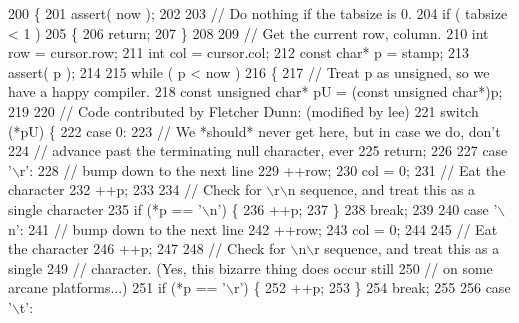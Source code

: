 \begin{DoxyCode}
200 \{
201   assert( now );
202 
203   \textcolor{comment}{// Do nothing if the tabsize is 0.}
204   \textcolor{keywordflow}{if} ( tabsize < 1 )
205   \{
206     \textcolor{keywordflow}{return};
207   \}
208 
209   \textcolor{comment}{// Get the current row, column.}
210   \textcolor{keywordtype}{int} row = cursor.row;
211   \textcolor{keywordtype}{int} col = cursor.col;
212   \textcolor{keyword}{const} \textcolor{keywordtype}{char}* p = stamp;
213   assert( p );
214 
215   \textcolor{keywordflow}{while} ( p < now )
216   \{
217     \textcolor{comment}{// Treat p as unsigned, so we have a happy compiler.}
218     \textcolor{keyword}{const} \textcolor{keywordtype}{unsigned} \textcolor{keywordtype}{char}* pU = (\textcolor{keyword}{const} \textcolor{keywordtype}{unsigned} \textcolor{keywordtype}{char}*)p;
219 
220     \textcolor{comment}{// Code contributed by Fletcher Dunn: (modified by lee)}
221     \textcolor{keywordflow}{switch} (*pU) \{
222       \textcolor{keywordflow}{case} 0:
223         \textcolor{comment}{// We *should* never get here, but in case we do, don't}
224         \textcolor{comment}{// advance past the terminating null character, ever}
225         \textcolor{keywordflow}{return};
226 
227       \textcolor{keywordflow}{case} \textcolor{charliteral}{'\(\backslash\)r'}:
228         \textcolor{comment}{// bump down to the next line}
229         ++row;
230         col = 0;        
231         \textcolor{comment}{// Eat the character}
232         ++p;
233 
234         \textcolor{comment}{// Check for \(\backslash\)r\(\backslash\)n sequence, and treat this as a single character}
235         \textcolor{keywordflow}{if} (*p == \textcolor{charliteral}{'\(\backslash\)n'}) \{
236           ++p;
237         \}
238         \textcolor{keywordflow}{break};
239 
240       \textcolor{keywordflow}{case} \textcolor{charliteral}{'\(\backslash\)n'}:
241         \textcolor{comment}{// bump down to the next line}
242         ++row;
243         col = 0;
244 
245         \textcolor{comment}{// Eat the character}
246         ++p;
247 
248         \textcolor{comment}{// Check for \(\backslash\)n\(\backslash\)r sequence, and treat this as a single}
249         \textcolor{comment}{// character.  (Yes, this bizarre thing does occur still}
250         \textcolor{comment}{// on some arcane platforms...)}
251         \textcolor{keywordflow}{if} (*p == \textcolor{charliteral}{'\(\backslash\)r'}) \{
252           ++p;
253         \}
254         \textcolor{keywordflow}{break};
255 
256       \textcolor{keywordflow}{case} \textcolor{charliteral}{'\(\backslash\)t'}:

\end{DoxyCode}
